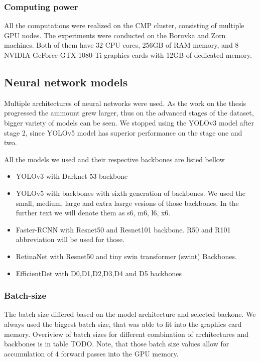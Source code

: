 \subsubsection{Computing power}
All the computations were realized on the CMP cluster, consisting of multiple GPU nodes. The experiments were conducted on the Boruvka and Zorn machines. Both of them have 32 CPU cores, 256GB of RAM memory, and 8 NVIDIA GeForce GTX 1080-Ti graphics cards with 12GB of dedicated memory.

\subsection{Neural network models}
Multiple architectures of neural networks were used. As the work on the thesis progressed the ammount grew larger, thus on the advanced stages of the dataset, bigger variety of models can be seen. We stopped using the YOLOv3 model after stage 2, since YOLOv5 model has superior performance on the stage one and two.

All the models we used and their respective backbones are listed bellow
\begin{itemize}
    \item YOLOv3 with Darknet-53 backbone
    \item YOLOv5 with backbones with sixth generation of backbones. We used the small, medium, large and extra lasrge vesions of those backbones. In the further text we will denote them as s6, m6, l6, x6.
    \item Faster-RCNN with Resnet50 and Resnet101 backbone. R50 and R101 abbreviation will be used for those.
    \item RetinaNet with Resnet50 and tiny swin transformer (swint) Backbones.
    \item EfficientDet with D0,D1,D2,D3,D4 and D5 backbones
\end{itemize}

\subsubsection{Batch-size}
The batch size differed based on the model architecture and selected backone. We always used the biggest batch size, that was able to fit into the graphics card memory. Overiview of batch sizes for different combination of architectures and backbones is in table TODO. Note, that those batch size values allow for accumulation of 4 forward passes into the GPU memory.

